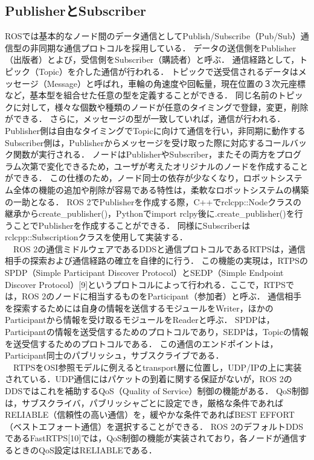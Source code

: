 \subsection{PublisherとSubscriber}
ROSでは基本的なノード間のデータ通信としてPublish/Subscribe（Pub/Sub）通信型の非同期な通信プロトコルを採用している．
データの送信側をPublisher（出版者）とよび，受信側をSubscriber（購読者）と呼ぶ．
通信経路として，トピック（Topic）を介した通信が行われる．
トピックで送受信されるデータはメッセージ（Message）と呼ばれ，車輪の角速度や回転量，現在位置の３次元座標など，基本型を組合せた任意の型を定義することができる．
同じ名前のトピックに対して，様々な個数や種類のノードが任意のタイミングで登録，変更，削除ができる．
さらに，メッセージの型が一致していれば，通信が行われる．
Publisher側は自由なタイミングでTopicに向けて通信を行い，非同期に動作するSubscriber側は，Publisherからメッセージを受け取った際に対応するコールバック関数が実行される．
ノードはPublisherやSubscriber，またその両方をプログラム次第で変化できるため，ユーザが考えたオリジナルのノードを作成することができる．
この仕様のため，ノード同士の依存が少なくなり，ロボットシステム全体の機能の追加や削除が容易である特性は，柔軟なロボットシステムの構築の一助となる．
ROS 2でPublisherを作成する際，C++でrclcpp::Nodeクラスの継承からcreate_publisher()，Pythonでimport rclpy後に.create_publisher()を行うことでPublisherを作成することができる．
同様にSubscriberはrclcpp::Subscriptionクラスを使用して実装する．
\\　ROS 2の通信ミドルウェアであるDDSと通信プロトコルであるRTPSは，通信相手の探索および通信経路の確立を自律的に行う．
この機能の実現は，RTPSのSPDP（Simple Participant Discover Protocol）とSEDP（Simple Endpoint Discover Protocol）[9]というプロトコルによって行われる．ここで，RTPSでは，ROS 2のノードに相当するものをParticipant（参加者）と呼ぶ．
通信相手を探索するためには自身の情報を送信するモジュールをWriter，ほかのParticipantから情報を受け取るモジュールをReaderと呼ぶ．
SPDPは，Participantの情報を送受信するためのプロトコルであり，SEDPは，Topicの情報を送受信するためのプロトコルである．
この通信のエンドポイントは，Participant同士のパブリッシュ，サブスクライブである．
\\　RTPSをOSI参照モデルに例えるとtransport層に位置し，UDP/IPの上に実装されている．UDP通信にはパケットの到着に関する保証がないが，ROS 2のDDSではこれを補助するQoS（Quality of Service）制御の機能がある．
QoS制御は，サブスクライバ，パブリッシャごとに設定でき，厳格な条件であればRELIABLE（信頼性の高い通信）を，緩やかな条件であればBEST EFFORT（ベストエフォート通信）を選択することができる．
ROS 2のデフォルトDDSであるFastRTPS[10]では，QoS制御の機能が実装されており，各ノードが通信するときのQoS設定はRELIABLEである．
